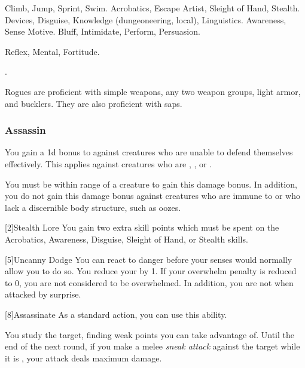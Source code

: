          Climb, Jump, Sprint, Swim.
         Acrobatics, Escape Artist, Sleight of Hand, Stealth.
         Devices, Disguise, Knowledge (dungeoneering, local), Linguistics.
         Awareness, Sense Motive.
         Bluff, Intimidate, Perform, Persuasion.

          Reflex,  Mental,  Fortitude.

         .

        Rogues are proficient with simple weapons, any two weapon groups, light armor, and bucklers.
        They are also proficient with saps.

        \subsubsection{Assassin}
             You gain a \plus1d bonus to  against creatures who are unable to defend themselves effectively.
            This applies against creatures who are \unaware, , or .

            You must be within \rngclose range of a creature to gain this damage bonus.
            In addition, you do not gain this damage bonus against creatures who are immune to  or who lack a discernible body structure, such as oozes.

            [2]{Stealth Lore} You gain two extra skill points which must be spent on the Acrobatics, Awareness, Disguise, Sleight of Hand, or Stealth skills.

            [5]{Uncanny Dodge} You can react to danger before your senses would normally allow you to do so.
            You reduce your  by 1.
            If your overwhelm penalty is reduced to 0, you are not considered to be overwhelmed.
            In addition, you are not \unaware when attacked by surprise.

            [8]{Assassinate} As a standard action, you can use this ability.
            \begin{ability}
                \begin{spelltargetinginfo}
                \end{spelltargetinginfo}
                \begin{spelleffects}
                    \spelleffect You study the target, finding weak points you can take advantage of.
                    Until the end of the next round, if you make a melee \textit{sneak attack} against the target while it is \unaware, your attack deals maximum damage.
                \end{spelleffects}
            \end{ability}

